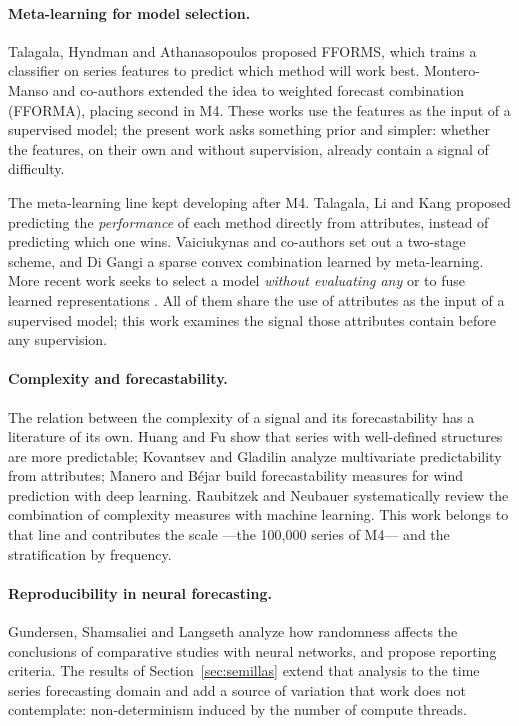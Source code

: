 \paragraph{Meta-learning for model selection.} Talagala, Hyndman and Athanasopoulos
\cite{talagala2018} proposed FFORMS, which trains a classifier on series features to
predict which method will work best. Montero-Manso and co-authors \cite{monteromanso2020}
extended the idea to weighted forecast combination (FFORMA), placing second in M4. These
works use the features as the input of a supervised model; the present work asks something
prior and simpler: whether the features, on their own and without supervision, already
contain a signal of difficulty.

The meta-learning line kept developing after M4. Talagala, Li and Kang
\cite{talagala2019} proposed predicting the \emph{performance} of each method directly
from attributes, instead of predicting which one wins. Vaiciukynas and co-authors
\cite{vaiciukynas2021} set out a two-stage scheme, and Di Gangi \cite{digangi2022} a
sparse convex combination learned by meta-learning. More recent work seeks to select a
model \emph{without evaluating any} \cite{abdallah2025} or to fuse learned representations
\cite{vanzyl2023}. All of them share the use of attributes as the input of a supervised
model; this work examines the signal those attributes contain before any supervision.

\paragraph{Complexity and forecastability.} The relation between the complexity of a
signal and its forecastability has a literature of its own. Huang and Fu \cite{huang2019}
show that series with well-defined structures are more predictable; Kovantsev and Gladilin
\cite{kovantsev2020} analyze multivariate predictability from attributes; Manero and
B\'ejar \cite{manero2021} build forecastability measures for wind prediction with deep
learning. Raubitzek and Neubauer \cite{raubitzek2021} systematically review the
combination of complexity measures with machine learning. This work belongs to that line
and contributes the scale ---the 100{,}000 series of M4--- and the stratification by
frequency.

\paragraph{Reproducibility in neural forecasting.} Gundersen, Shamsaliei and Langseth
\cite{gundersen2023} analyze how randomness affects the conclusions of comparative studies
with neural networks, and propose reporting criteria. The results of
Section~\ref{sec:semillas} extend that analysis to the time series forecasting domain and
add a source of variation that work does not contemplate: non-determinism induced by the
number of compute threads.

